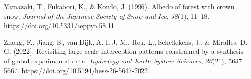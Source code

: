 \documentclass[
  letterpaper,
]{tex/uofsthesis-cs}
\newlength{\cslhangindent}
\newenvironment{CSLReferences}[2] %
 {\begin{list}{}{%
  \setlength{\itemindent}{0pt}
  \setlength{\leftmargin}{0pt}
  \setlength{\parsep}{0pt}
  \ifodd #1
   \setlength{\leftmargin}{\cslhangindent}
   \setlength{\itemindent}{-1\cslhangindent}
  \fi
  \setlength{\itemsep}{#2\baselineskip}}}
 {\end{list}}
\begin{document}
\begin{CSLReferences}{1}{0}
Yamazaki, T., Fukabori, K., \& Kondo, J. (1996). Albedo of forest with
crown snow. \emph{Journal of the Japanese Society of Snow and Ice},
\emph{58}(1), 11--18. \url{https://doi.org/10.5331/seppyo.58.11}

Zhong, F., Jiang, S., van Dijk, A. I. J. M., Ren, L., Schellekens, J.,
\& Miralles, D. G. (2022). Revisiting large-scale interception patterns
constrained by a synthesis of global experimental data. \emph{Hydrology
and Earth System Sciences}, \emph{26}(21), 5647--5667.
\url{https://doi.org/10.5194/hess-26-5647-2022}

\end{CSLReferences}
\end{document}
